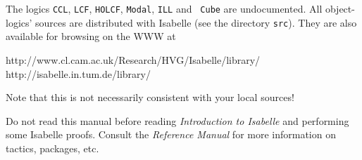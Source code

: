 The logics \texttt{CCL}, \texttt{LCF}, \texttt{HOLCF}, \texttt{Modal}, \texttt{ILL} and {\tt
  Cube} are undocumented.  All object-logics' sources are
distributed with Isabelle (see the directory \texttt{src}).  They are
also available for browsing on the WWW at
\begin{ttbox}
http://www.cl.cam.ac.uk/Research/HVG/Isabelle/library/
http://isabelle.in.tum.de/library/
\end{ttbox}
Note that this is not necessarily consistent with your local sources!

\medskip Do not read this manual before reading \emph{Introduction to
  Isabelle} and performing some Isabelle proofs.  Consult the {\em Reference
  Manual} for more information on tactics, packages, etc.



